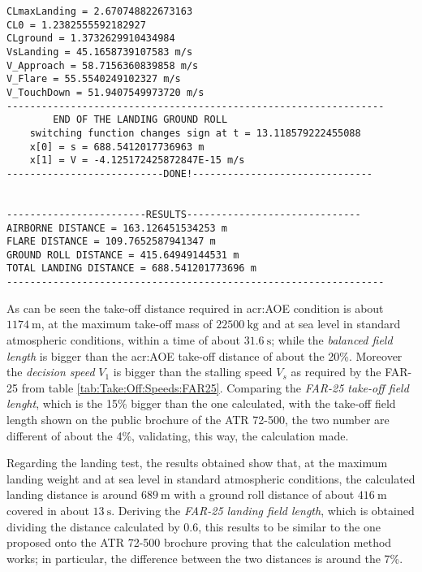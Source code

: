 \bigskip
\begin{lstlisting}[caption={ATR-72 landing test results}, captionpos=b, tabsize=2]
CLmaxLanding = 2.670748822673163
CL0 = 1.2382555592182927
CLground = 1.3732629910434984
VsLanding = 45.1658739107583 m/s
V_Approach = 58.7156360839858 m/s
V_Flare = 55.5540249102327 m/s
V_TouchDown = 51.9407549973720 m/s
-----------------------------------------------------------------
		END OF THE LANDING GROUND ROLL
	switching function changes sign at t = 13.118579222455088
	x[0] = s = 688.5412017736963 m
	x[1] = V = -4.125172425872847E-15 m/s
---------------------------DONE!-------------------------------


------------------------RESULTS------------------------------
AIRBORNE DISTANCE = 163.126451534253 m
FLARE DISTANCE = 109.7652587941347 m
GROUND ROLL DISTANCE = 415.64949144531 m
TOTAL LANDING DISTANCE = 688.541201773696 m
-----------------------------------------------------------------
\end{lstlisting}
%
As can be seen the take-off distance required in \gls{acr:AOE} condition is about $\SI{1174}{\meter}$, at the maximum take-off mass of $\SI{22500}{\kilogram}$ and at sea level in standard atmospheric conditions, within a time of about $\SI{31.6}{\second}$; while the \emph{balanced field length} is bigger than the \gls{acr:AOE} take-off distance of about the 20\%. Moreover the \emph{decision speed} $V_1$ is bigger than the stalling speed $V_s$ as required by the \gls{FAR}-25 from table \ref{tab:Take:Off:Speeds:FAR25}. Comparing the \emph{FAR-25 take-off field lenght}, which is the 15\% bigger than the one calculated, with the take-off field length shown on the public brochure of the ATR 72-500, the two number are different of about the 4\%, validating, this way, the calculation made.  

\bigskip
\noindent
Regarding the landing test, the results obtained show that, at the maximum landing weight and at sea level in standard atmospheric conditions, the calculated landing distance is around $\SI{689}{\meter}$ with a ground roll distance of about $\SI{416}{\meter}$ covered in about $\SI{13}{\second}$. Deriving the \emph{FAR-25 landing field length}, which is obtained dividing the distance calculated by 0.6, this results to be similar to the one proposed onto the ATR 72-500 brochure proving that the calculation method works; in particular, the difference between the two distances is around the 7\%.

